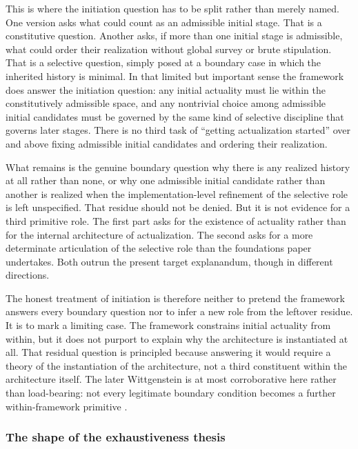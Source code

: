 \documentclass[11pt]{article}
\theoremstyle{foundation}
\begin{document}
This is where the initiation question has to be split rather than merely named. One version asks what could count as an admissible initial stage. That is a constitutive question. Another asks, if more than one initial stage is admissible, what could order their realization without global survey or brute stipulation. That is a selective question, simply posed at a boundary case in which the inherited history is minimal. In that limited but important sense the framework does answer the initiation question: any initial actuality must lie within the constitutively admissible space, and any nontrivial choice among admissible initial candidates must be governed by the same kind of selective discipline that governs later stages. There is no third task of ``getting actualization started'' over and above fixing admissible initial candidates and ordering their realization.

What remains is the genuine boundary question why there is any realized history at all rather than none, or why one admissible initial candidate rather than another is realized when the implementation-level refinement of the selective role is left unspecified. That residue should not be denied. But it is not evidence for a third primitive role. The first part asks for the existence of actuality rather than for the internal architecture of actualization. The second asks for a more determinate articulation of the selective role than the foundations paper undertakes. Both outrun the present target explanandum, though in different directions.

The honest treatment of initiation is therefore neither to pretend the framework answers every boundary question nor to infer a new role from the leftover residue. It is to mark a limiting case. The framework constrains initial actuality from within, but it does not purport to explain why the architecture is instantiated at all. That residual question is principled because answering it would require a theory of the instantiation of the architecture, not a third constituent within the architecture itself. The later Wittgenstein is at most corroborative here rather than load-bearing: not every legitimate boundary condition becomes a further within-framework primitive \citep{Wittgenstein1969}.

\subsubsection{The shape of the exhaustiveness thesis}
\end{document}
